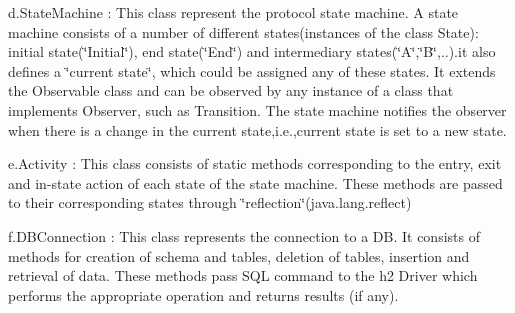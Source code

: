 d.\-State\-Machine \-: This class represent the protocol state machine. A state machine consists of a number of different states(instances of the class State)\-: initial state(\char`\"{}\-Initial\char`\"{}), end state(\char`\"{}\-End\char`\"{}) and intermediary states(\char`\"{}\-A\char`\"{},\char`\"{}\-B\char`\"{},..).it also defines a \char`\"{}current state\char`\"{}, which could be assigned any of these states. It extends the Observable class and can be observed by any instance of a class that implements Observer, such as Transition. The state machine notifies the observer when there is a change in the current state,i.\-e.,current state is set to a new state.

e.\-Activity \-: This class consists of static methods corresponding to the entry, exit and in-\/state action of each state of the state machine. These methods are passed to their corresponding states through \char`\"{}reflection\char`\"{}(java.\-lang.\-reflect)

f.\-D\-B\-Connection \-: This class represents the connection to a D\-B. It consists of methods for creation of schema and tables, deletion of tables, insertion and retrieval of data. These methods pass S\-Q\-L command to the h2 Driver which performs the appropriate operation and returns results (if any). 